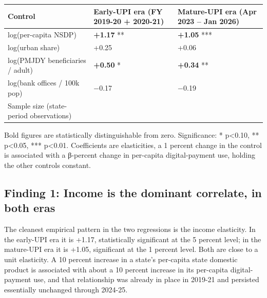 \documentclass[
]{article}
\begin{document}
\begin{longtable}[]{@{}
  >{\raggedright\arraybackslash}p{}
  >{\raggedleft\arraybackslash}p{}
  >{\raggedleft\arraybackslash}p{}@{}}
\toprule\noalign{}
\begin{minipage}[b]{\linewidth}\raggedright
Control
\end{minipage} & \begin{minipage}[b]{\linewidth}\raggedleft
Early-UPI era (FY 2019-20 + 2020-21)
\end{minipage} & \begin{minipage}[b]{\linewidth}\raggedleft
Mature-UPI era (Apr 2023 -- Jan 2026)
\end{minipage} \\
\midrule\noalign{}
\endhead
\bottomrule\noalign{}
\endlastfoot
log(per-capita NSDP) & \textbf{+1.17} ** & \textbf{+1.05} *** \\
log(urban share) & +0.25 & +0.06 \\
log(PMJDY beneficiaries / adult) & \textbf{+0.50} * & \textbf{+0.34}
** \\
log(bank offices / 100k pop) & −0.17 & −0.19 \\
Sample size (state-period observations) & 66 & 99 \\
\end{longtable}

Bold figures are statistically distinguishable from zero. Significance:
* p\textless0.10, ** p\textless0.05, *** p\textless0.01. Coefficients
are elasticities, a 1 percent change in the control is associated with a
β-percent change in per-capita digital-payment use, holding the other
controls constant.

\subsection{Finding 1: Income is the dominant correlate, in both
eras}\label{finding-1-income-is-the-dominant-correlate-in-both-eras}

The cleanest empirical pattern in the two regressions is the income
elasticity. In the early-UPI era it is +1.17, statistically significant
at the 5 percent level; in the mature-UPI era it is +1.05, significant
at the 1 percent level. Both are close to a unit elasticity. A 10
percent increase in a state's per-capita state domestic product is
associated with about a 10 percent increase in its per-capita
digital-payment use, and that relationship was already in place in
2019-21 and persisted essentially unchanged through 2024-25.
\end{document}
